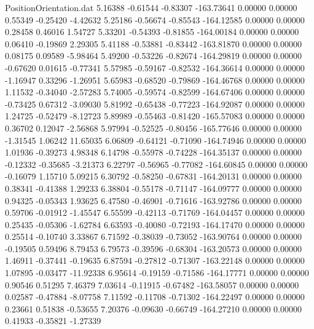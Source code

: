 \begin{filecontents}{PositionOrientation.dat}
   5.16388   -0.61544   -0.83307  -163.73641    0.00000    0.00000    0.55349   -0.25420   -4.42632
   5.25186   -0.56674   -0.85543  -164.12585    0.00000    0.00000    0.28458    0.46016    1.54727
   5.33201   -0.54393   -0.81855  -164.00184    0.00000    0.00000    0.06410   -0.19869    2.29305
   5.41188   -0.53881   -0.83442  -163.81870    0.00000    0.00000    0.08175    0.09589   -5.98464
   5.49200   -0.53226   -0.82674  -164.29819    0.00000    0.00000   -0.67620    0.01615   -0.77341
   5.57985   -0.59167   -0.82532  -164.36614    0.00000    0.00000   -1.16947    0.33296   -1.26951
   5.65983   -0.68520   -0.79869  -164.46768    0.00000    0.00000    1.11532   -0.34040   -2.57283
   5.74005   -0.59574   -0.82599  -164.67406    0.00000    0.00000   -0.73425    0.67312   -3.09030
   5.81992   -0.65438   -0.77223  -164.92087    0.00000    0.00000    1.24725   -0.52479   -8.12723
   5.89989   -0.55463   -0.81420  -165.57083    0.00000    0.00000    0.36702    0.12047   -2.56868
   5.97994   -0.52525   -0.80456  -165.77646    0.00000    0.00000   -1.31545    1.06242   11.65035
   6.06809   -0.64121   -0.71090  -164.74946    0.00000    0.00000    1.01936   -0.39273    4.98348
   6.14798   -0.55978   -0.74228  -164.35137    0.00000    0.00000   -0.12332   -0.35685   -3.21373
   6.22797   -0.56965   -0.77082  -164.60845    0.00000    0.00000   -0.16079    1.15710    5.09215
   6.30792   -0.58250   -0.67831  -164.20131    0.00000    0.00000    0.38341   -0.41388    1.29233
   6.38804   -0.55178   -0.71147  -164.09777    0.00000    0.00000    0.94325   -0.05343    1.93625
   6.47580   -0.46901   -0.71616  -163.92786    0.00000    0.00000    0.59706   -0.01912   -1.45547
   6.55599   -0.42113   -0.71769  -164.04457    0.00000    0.00000    0.25435   -0.05306   -1.62784
   6.63593   -0.40080   -0.72193  -164.17470    0.00000    0.00000    0.25514   -0.10740    3.33867
   6.71592   -0.38039   -0.73052  -163.90764    0.00000    0.00000   -0.19505    0.59496    8.79453
   6.79573   -0.39596   -0.68304  -163.20573    0.00000    0.00000    1.46911   -0.37441   -0.19635
   6.87594   -0.27812   -0.71307  -163.22148    0.00000    0.00000    1.07895   -0.03477  -11.92338
   6.95614   -0.19159   -0.71586  -164.17771    0.00000    0.00000    0.90546    0.51295    7.46379
   7.03614   -0.11915   -0.67482  -163.58057    0.00000    0.00000    0.02587   -0.47884   -8.07758
   7.11592   -0.11708   -0.71302  -164.22497    0.00000    0.00000    0.23661    0.51838   -0.53655
   7.20376   -0.09630   -0.66749  -164.27210    0.00000    0.00000    0.41933   -0.35821   -1.27339

\end{filecontents}
